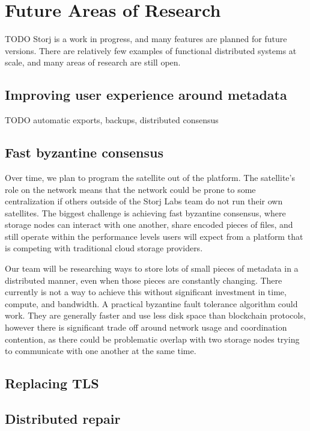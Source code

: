 \documentclass[11pt,fleqn,openany]{book}
\newcommand{\todo}[1]{{\color{red} TODO #1 }}
\begin{document}
\chapter{Future Areas of Research}\label{chap:future-work}

\todo{ Storj is a work in progress, and many features are planned for future
versions. There are relatively few examples of functional distributed systems at
scale, and many areas of research are still open. }

\section{Improving user experience around metadata}

\todo{automatic exports, backups, distributed consensus}

\section{Fast byzantine consensus}

Over time, we plan to program the satellite out of the platform.
The satellite's role on the network means that the network could be prone
to some
centralization if others outside of the Storj Labs team do not run their own
satellites. The biggest challenge is achieving fast byzantine consensus,
where storage nodes can interact with one another, share encoded pieces of
files,
and still operate within the performance levels users will expect from a
platform that is competing with traditional cloud storage providers.

Our team will be researching ways to store lots of small pieces of metadata
in a distributed manner, even when those pieces are constantly changing. There
currently is not a way to achieve this without significant investment in time,
compute, and bandwidth. A practical byzantine fault tolerance algorithm could
work. They are generally faster and use less disk space than blockchain
protocols, however there is significant trade off around network usage and
coordination contention, as there could be problematic overlap with two storage
nodes trying to communicate with one another at the same time.

\section{Replacing TLS}\label{sec:future-work-tls}

\section{Distributed repair}
\end{document}
